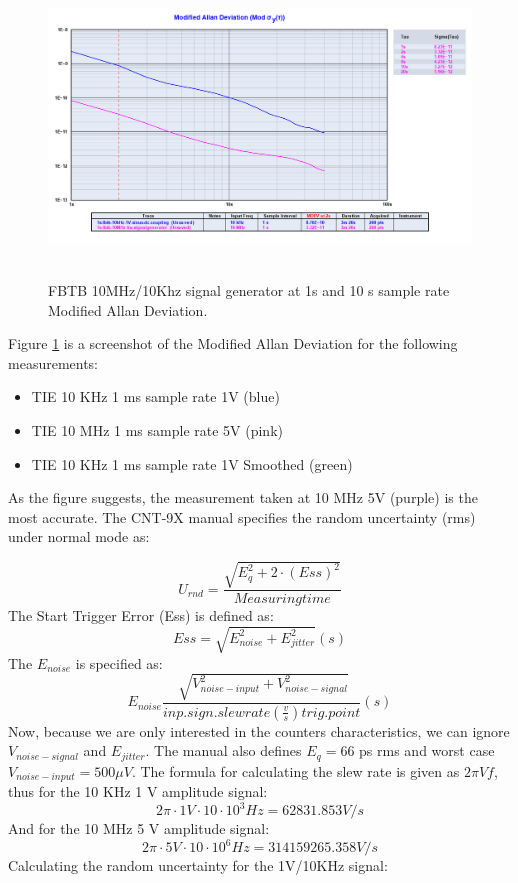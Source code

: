 \documentclass[11pt,english,a4paper]{article}
\begin{document}
\begin{figure}[!htb]
  \centering
    \includegraphics[width=1\textwidth]{fbtb_10mhzkhz_generator_mod_allan.png}\
  \caption{FBTB 10MHz/10Khz signal generator at 1s and 10 s sample rate Modified Allan Deviation.}
      \label{fig:sg_10x_mod_allan_dev}
\end{figure}

Figure \ref{fig:sg_10x_mod_allan_dev} is a screenshot of the Modified Allan Deviation for the following measurements:
\begin{itemize}
  \item TIE 10 KHz 1 ms sample rate 1V (blue)
  \item TIE 10 MHz 1 ms sample rate 5V (pink)
  \item TIE 10 KHz 1 ms sample rate 1V Smoothed (green)
\end{itemize}
As the figure suggests, the measurement taken at 10 MHz 5V (purple) is the most accurate. The CNT-9X manual specifies the random uncertainty (rms) under normal mode as:

\begin{displaymath}
U_{rnd}=\frac{\sqrt{E_{q}^2 + 2\cdot(Ess)^2}}{Measuring time}
\end{displaymath}
The Start Trigger Error (Ess) is defined as:
\begin{displaymath}
Ess = \sqrt{ E_{noise}^2 + E_{jitter}^2 }(s)
\end{displaymath}
The $E_{noise}$ is specified as:
\begin{displaymath}
E_{noise}\frac{\sqrt[]{V_{noise-input}^2 + V_{noise-signal}^2}}{inp.sign.slew rate(\frac{v}{s}) trig. point}(s)
\end{displaymath}
Now, because we are only interested in the counters characteristics, we can ignore $V_{noise-signal}$ and $E_{jitter}$. The manual also defines $E_{q} = 66$ ps rms and worst case $V_{noise-input} = 500 \mu V$. The formula for calculating the slew rate is given as $2\pi Vf$, thus for the 10 KHz 1 V amplitude signal:
\begin{displaymath}
2\pi\cdot1 V\cdot10\cdot10^3 Hz = 62831.853 V/s
\end{displaymath}
And for the 10 MHz 5 V amplitude signal:
\begin{displaymath}
2\pi\cdot5 V\cdot10\cdot10^6 Hz = 314159265.358 V/s
\end{displaymath}
\newline
Calculating the random uncertainty for the 1V/10KHz signal:
\end{document}
